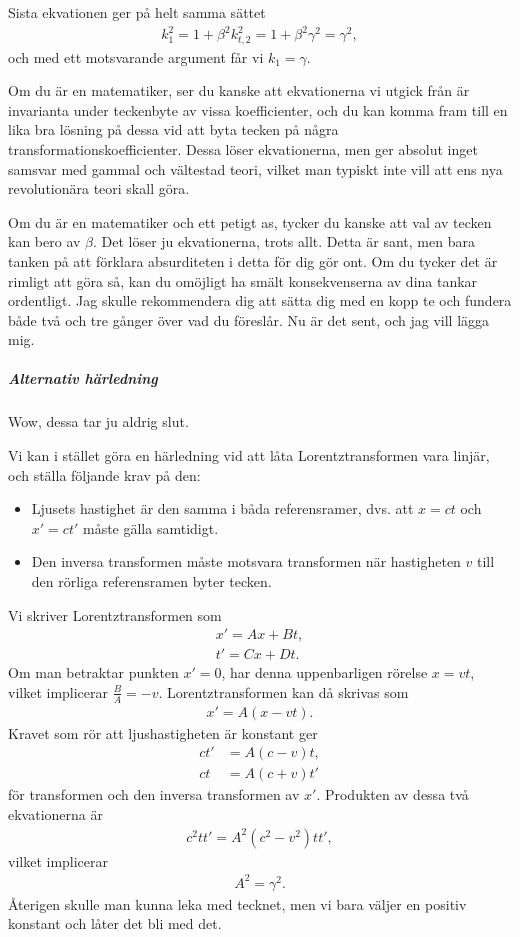 Sista ekvationen ger på helt samma sättet
\begin{align*}
	k_{1}^{2} = 1 + \beta^{2}k_{t, 2}^{2} = 1 + \beta^{2}\gamma^{2} = \gamma^{2},
\end{align*}
och med ett motsvarande argument får vi $k_{1} = \gamma$.

Om du är en matematiker, ser du kanske att ekvationerna vi utgick från är invarianta under teckenbyte av vissa koefficienter, och du kan komma fram till en lika bra lösning på dessa vid att byta tecken på några transformationskoefficienter. Dessa löser ekvationerna, men ger absolut inget samsvar med gammal och vältestad teori, vilket man typiskt inte vill att ens nya revolutionära teori skall göra.

Om du är en matematiker och ett petigt as, tycker du kanske att val av tecken kan bero av $\beta$. Det löser ju ekvationerna, trots allt. Detta är sant, men bara tanken på att förklara absurditeten i detta för dig gör ont. Om du tycker det är rimligt att göra så, kan du omöjligt ha smält konsekvenserna av dina tankar ordentligt. Jag skulle rekommendera dig att sätta dig med en kopp te och fundera både två och tre gånger över vad du föreslår. Nu är det sent, och jag vill lägga mig.

\subparagraph{Alternativ härledning}
Wow, dessa tar ju aldrig slut.

Vi kan i stället göra en härledning vid att låta Lorentztransformen vara linjär, och ställa följande krav på den:
\begin{itemize}
	\item Ljusets hastighet är den samma i båda referensramer, dvs. att $x = ct$ och $x' = ct'$ måste gälla samtidigt.
	\item Den inversa transformen måste motsvara transformen när hastigheten $v$ till den rörliga referensramen byter tecken.
\end{itemize}
Vi skriver Lorentztransformen som
\begin{align*}
	x' = Ax + Bt, \\
	t' = Cx + Dt.
\end{align*}
Om man betraktar punkten $x' = 0$, har denna uppenbarligen rörelse $x = vt$, vilket implicerar $\frac{B}{A} = -v$. Lorentztransformen kan då skrivas som
\begin{align*}
	x' = A(x - vt).
\end{align*}
Kravet som rör att ljushastigheten är konstant ger
\begin{align*}
	ct' &= A(c - v)t, \\
	ct  &= A(c + v)t'
\end{align*}
för transformen och den inversa transformen av $x'$. Produkten av dessa två ekvationerna är
\begin{align*}
	c^{2}tt' = A^{2}(c^{2} - v^{2})tt',
\end{align*}
vilket implicerar
\begin{align*}
	A^{2}  = \gamma^{2}.
\end{align*}
Återigen skulle man kunna leka med tecknet, men vi bara väljer en positiv konstant och låter det bli med det.

